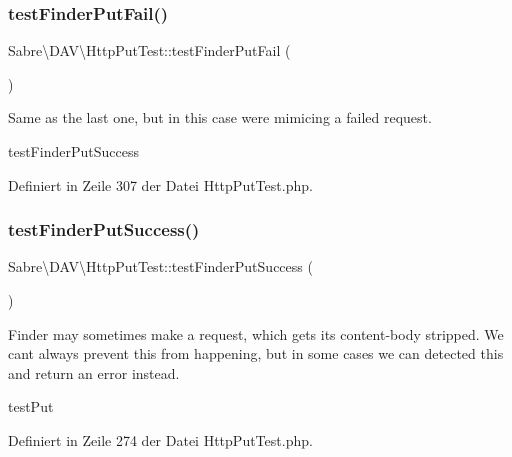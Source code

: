 \subsubsection{\texorpdfstring{test\+Finder\+Put\+Fail()}{testFinderPutFail()}}
{\footnotesize\ttfamily Sabre\textbackslash{}\+D\+A\+V\textbackslash{}\+Http\+Put\+Test\+::test\+Finder\+Put\+Fail (\begin{DoxyParamCaption}{ }\end{DoxyParamCaption})}

Same as the last one, but in this case we\textquotesingle{}re mimicing a failed request.

test\+Finder\+Put\+Success 

Definiert in Zeile 307 der Datei Http\+Put\+Test.\+php.

\mbox{\label{class_sabre_1_1_d_a_v_1_1_http_put_test_ac2717346a9ea93187de39b16cb7596e6}} 
\subsubsection{\texorpdfstring{test\+Finder\+Put\+Success()}{testFinderPutSuccess()}}
{\footnotesize\ttfamily Sabre\textbackslash{}\+D\+A\+V\textbackslash{}\+Http\+Put\+Test\+::test\+Finder\+Put\+Success (\begin{DoxyParamCaption}{ }\end{DoxyParamCaption})}

Finder may sometimes make a request, which gets its content-\/body stripped. We can\textquotesingle{}t always prevent this from happening, but in some cases we can detected this and return an error instead.

test\+Put 

Definiert in Zeile 274 der Datei Http\+Put\+Test.\+php.

\mbox{\label{class_sabre_1_1_d_a_v_1_1_http_put_test_a05fa4499976b8151b58fc58de7f71fdb}} 

